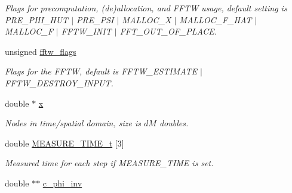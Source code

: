 \begin{DoxyCompactItemize}
\begin{DoxyCompactList}\small\item\em Flags for precomputation, (de)allocation, and F\-F\-T\-W usage, default setting is P\-R\-E\-\_\-\-P\-H\-I\-\_\-\-H\-U\-T $\vert$ P\-R\-E\-\_\-\-P\-S\-I $\vert$ M\-A\-L\-L\-O\-C\-\_\-\-X $\vert$ M\-A\-L\-L\-O\-C\-\_\-\-F\-\_\-\-H\-A\-T $\vert$ M\-A\-L\-L\-O\-C\-\_\-\-F $\vert$ F\-F\-T\-W\-\_\-\-I\-N\-I\-T $\vert$ F\-F\-T\-\_\-\-O\-U\-T\-\_\-\-O\-F\-\_\-\-P\-L\-A\-C\-E. \end{DoxyCompactList}\item 
\hypertarget{structnfft__plan_a530aea04dba32fb2a41287b4581b1805}{unsigned \hyperlink{structnfft__plan_a530aea04dba32fb2a41287b4581b1805}{fftw\-\_\-flags}}\label{structnfft__plan_a530aea04dba32fb2a41287b4581b1805}

\begin{DoxyCompactList}\small\item\em Flags for the F\-F\-T\-W, default is F\-F\-T\-W\-\_\-\-E\-S\-T\-I\-M\-A\-T\-E $\vert$ F\-F\-T\-W\-\_\-\-D\-E\-S\-T\-R\-O\-Y\-\_\-\-I\-N\-P\-U\-T. \end{DoxyCompactList}\item 
\hypertarget{structnfft__plan_a7eb64fb5fedfba0ec75261e777e020c0}{double $\ast$ \hyperlink{structnfft__plan_a7eb64fb5fedfba0ec75261e777e020c0}{x}}\label{structnfft__plan_a7eb64fb5fedfba0ec75261e777e020c0}

\begin{DoxyCompactList}\small\item\em Nodes in time/spatial domain, size is $dM$ doubles. \end{DoxyCompactList}\item 
\hypertarget{structnfft__plan_a7c3e5504175fa292a6a5d0c0e1d7f848}{double \hyperlink{structnfft__plan_a7c3e5504175fa292a6a5d0c0e1d7f848}{M\-E\-A\-S\-U\-R\-E\-\_\-\-T\-I\-M\-E\-\_\-t} \mbox{[}3\mbox{]}}\label{structnfft__plan_a7c3e5504175fa292a6a5d0c0e1d7f848}

\begin{DoxyCompactList}\small\item\em Measured time for each step if M\-E\-A\-S\-U\-R\-E\-\_\-\-T\-I\-M\-E is set. \end{DoxyCompactList}\item 
\hypertarget{structnfft__plan_aa5dd76324152be95967c0a4717e8e4ce}{double $\ast$$\ast$ \hyperlink{structnfft__plan_aa5dd76324152be95967c0a4717e8e4ce}{c\-\_\-phi\-\_\-inv}}\label{structnfft__plan_aa5dd76324152be95967c0a4717e8e4ce}


\end{DoxyCompactItemize}
